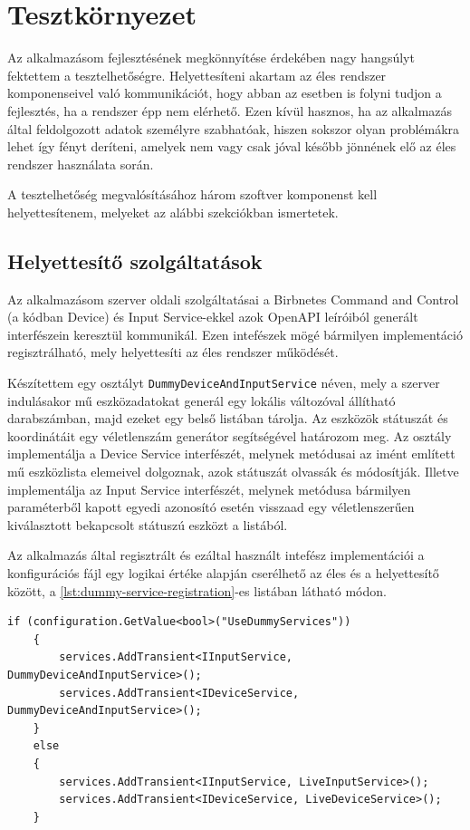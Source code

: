 \chapter{Tesztkörnyezet}
\label{chapt:birdmap-test}
Az alkalmazásom fejlesztésének megkönnyítése érdekében nagy hangsúlyt fektettem a tesztelhetőségre.
Helyettesíteni akartam az éles rendszer komponenseivel való kommunikációt,
hogy abban az esetben is folyni tudjon a fejlesztés, ha a rendszer épp nem elérhető.
Ezen kívül hasznos, ha az alkalmazás által feldolgozott adatok személyre szabhatóak,
hiszen sokszor olyan problémákra lehet így fényt deríteni, amelyek nem vagy csak jóval később jönnének elő az éles rendszer használata során.

A tesztelhetőség megvalósításához három szoftver komponenst kell helyettesítenem,
melyeket az alábbi szekciókban ismertetek.
\section{Helyettesítő szolgáltatások}
Az alkalmazásom szerver oldali szolgáltatásai a Birbnetes Command and Control (a kódban Device) és Input Service-ekkel azok OpenAPI leíróiból generált interfészein keresztül kommunikál.
Ezen intefészek mögé bármilyen implementáció regisztrálható, mely helyettesíti az éles rendszer működését.

Készítettem egy osztályt \verb+DummyDeviceAndInputService+ néven, mely a szerver indulásakor mű eszközadatokat generál egy lokális változóval állítható darabszámban,
majd ezeket egy belső listában tárolja. Az eszközök státuszát és koordinátáit egy véletlenszám generátor segítségével határozom meg.
Az osztály implementálja a Device Service interfészét, melynek metódusai az imént említett mű eszközlista elemeivel dolgoznak,
azok státuszát olvassák és módosítják.
Illetve implementálja az Input Service interfészét, 
melynek metódusa bármilyen paraméterből kapott egyedi azonosító esetén visszaad egy véletlenszerűen kiválasztott bekapcsolt státuszú eszközt a listából.

Az alkalmazás által regisztrált és ezáltal használt intefész implementációi a konfigurációs fájl egy logikai értéke alapján cserélhető az éles és a helyettesítő között,
a \ref{lst:dummy-service-registration}-es listában látható módon.
\newpage
\begin{lstlisting}[style=csharp, caption=A helyettesítő és az éles szolgáltatások regisztrálásának logikája, label=lst:dummy-service-registration]
    if (configuration.GetValue<bool>("UseDummyServices"))
    {
        services.AddTransient<IInputService, DummyDeviceAndInputService>();
        services.AddTransient<IDeviceService, DummyDeviceAndInputService>();
    }
    else
    {
        services.AddTransient<IInputService, LiveInputService>();
        services.AddTransient<IDeviceService, LiveDeviceService>();
    }
\end{lstlisting}


